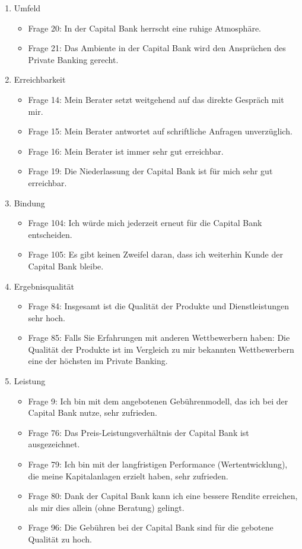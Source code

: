 \documentclass{article}\usepackage[]{graphicx}\usepackage[]{color}
\begin{document}
\begin{enumerate}
		
	\item Umfeld
		\begin{itemize}
			\item Frage 20:
			In der Capital Bank herrscht eine ruhige Atmosphäre.
			\item Frage 21:
			Das Ambiente in der Capital Bank wird den Ansprüchen des Private Banking gerecht.
		\end{itemize}
		
		
	\item Erreichbarkeit
		\begin{itemize}
			\item Frage 14:
			Mein Berater setzt weitgehend auf das direkte Gespräch mit mir.
			\item Frage 15:
			Mein Berater antwortet auf schriftliche Anfragen unverzüglich.
			\item Frage 16:
			Mein Berater ist immer sehr gut erreichbar.
			\item Frage 19:
			Die Niederlassung der Capital Bank ist für mich sehr gut erreichbar.
		\end{itemize}	
		
		
	\item Bindung
		\begin{itemize}
			\item Frage 104:
			Ich würde mich jederzeit erneut für die Capital Bank entscheiden.
			\item Frage 105:
			Es gibt keinen Zweifel daran, dass ich weiterhin Kunde der Capital Bank bleibe.
		\end{itemize}
		
		
	\item Ergebnisqualität
		\begin{itemize}
			\item Frage 84:
			Insgesamt ist die Qualität der Produkte und Dienstleistungen sehr hoch.
			\item Frage 85:
			Falls Sie Erfahrungen mit anderen Wettbewerbern haben:
			Die Qualität der Produkte ist im Vergleich zu mir bekannten Wettbewerbern eine der höchsten im Private Banking.
		\end{itemize}
		
		
	\item Leistung
		\begin{itemize}
			\item Frage 9:
			Ich bin mit dem angebotenen Gebührenmodell, das ich bei der Capital Bank nutze, sehr zufrieden.
			\item Frage 76:
			Das Preis-Leistungsverhältnis der Capital Bank ist ausgezeichnet.
			\item Frage 79:
			Ich bin mit der langfristigen Performance (Wertentwicklung), die meine Kapitalanlagen erzielt haben, sehr zufrieden.
			\item Frage 80:
			Dank der Capital Bank kann ich eine bessere Rendite erreichen, als mir dies allein (ohne Beratung) gelingt.
			\item Frage 96:
			Die Gebühren bei der Capital Bank sind für die gebotene Qualität zu hoch.
		\end{itemize}
		

\end{enumerate}
\end{document}
